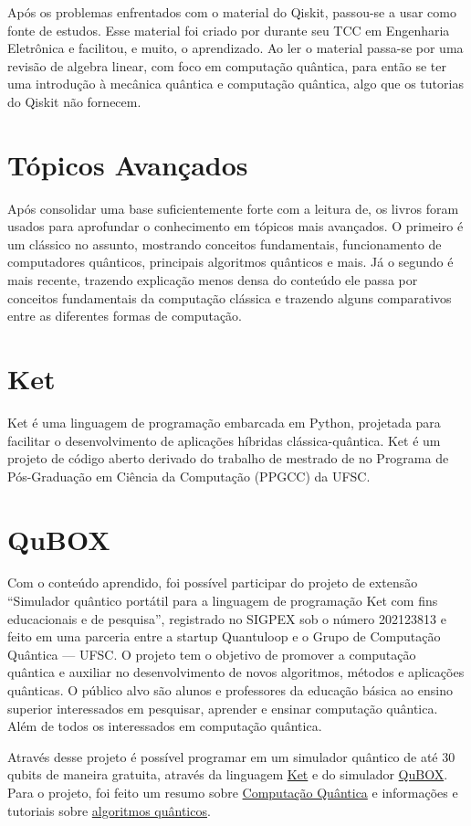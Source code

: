 Após os problemas enfrentados com o material do Qiskit, passou-se a usar\cite{giovani} como fonte de estudos.
Esse material foi criado por \citeauthor{giovani} durante seu TCC em Engenharia Eletrônica e facilitou, e muito, o aprendizado.
Ao ler o material passa-se por uma revisão de algebra linear, com foco em computação quântica, para então se ter uma introdução à mecânica quântica e computação quântica, algo que os tutorias do Qiskit não fornecem.

\section{Tópicos Avançados}\label{sec:topicos-avancados}

Após consolidar uma base suficientemente forte com a leitura de\cite{giovani}, os livros\cite{nielsen_chuang_2010, thomas-wong} foram usados para aprofundar o conhecimento em tópicos mais avançados.
O primeiro é um clássico no assunto, mostrando conceitos fundamentais, funcionamento de computadores quânticos, principais algoritmos quânticos e mais.
Já o segundo é mais recente, trazendo explicação menos densa do conteúdo ele passa por conceitos fundamentais da computação clássica e trazendo alguns comparativos entre as diferentes formas de computação.

\section{Ket}\label{sec:ket}

Ket é uma linguagem de programação embarcada em Python, projetada para facilitar o desenvolvimento de aplicações híbridas clássica-quântica.
Ket é um projeto de código aberto derivado do trabalho de mestrado de \citeauthor{ket} no Programa de Pós-Graduação em Ciência da Computação (PPGCC) da UFSC.


\section{QuBOX}\label{sec:qubox}

Com o conteúdo aprendido, foi possível participar do projeto de extensão “Simulador quântico portátil para a linguagem de programação Ket com fins educacionais e de pesquisa”, registrado no SIGPEX sob o número 202123813 e feito em uma parceria entre a startup Quantuloop e o Grupo de Computação Quântica — UFSC.
O projeto tem o objetivo de promover a computação quântica e auxiliar no desenvolvimento de novos algoritmos, métodos e aplicações quânticas.
O público alvo são alunos e professores da educação básica ao ensino superior interessados em pesquisar, aprender e ensinar computação quântica.
Além de todos os interessados em computação quântica.

Através desse projeto é possível programar em um simulador quântico de até 30 qubits de maneira gratuita, através da linguagem \href{https://quantumket.org/}{Ket} e do simulador \href{https://qubox.ufsc.br/qubox.html}{QuBOX}.
Para o projeto, foi feito um resumo sobre \href{https://qubox.ufsc.br/qc.html}{Computação Quântica} e informações e tutoriais sobre \href{https://qubox.ufsc.br/algoritmos/index.html}{algoritmos quânticos}.
